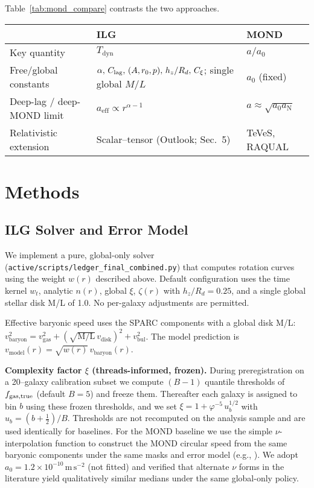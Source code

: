 \documentclass[usenatbib]{mnras}
\begin{document}
Table~\ref{tab:mond_compare} contrasts the two approaches.

\begin{table*}
\centering
\small
\setlength{\tabcolsep}{8pt}
\caption{Comparison of ILG and MOND Scaling Relations}
\label{tab:mond_compare}
\begin{tabularx}{0.97\textwidth}{l >{\raggedright\arraybackslash}X >{\raggedright\arraybackslash}X}
\toprule
 & ILG & MOND \\
\midrule
Key quantity & $T_\mathrm{dyn}$ & $a/a_0$ \\
Free/global constants & $\alpha,\,C_{\rm lag},\,(A,r_0,p),\,h_z/R_d,\,C_\xi$; single global $M/L$ & $a_0$ (fixed) \\
Deep-lag / deep-MOND limit & $a_\mathrm{eff} \propto r^{\alpha-1}$ & $a \approx \sqrt{a_0 a_\mathrm{N}}$ \\
Relativistic extension & Scalar–tensor (Outlook; Sec.~5) & TeVeS, RAQUAL \\
\bottomrule
\end{tabularx}
\end{table*}

\section{Methods}

\subsection{ILG Solver and Error Model}

We implement a pure, global-only solver (\texttt{active/scripts/ledger\_final\_combined.py}) that computes rotation curves using the weight $w(r)$ described above. Default configuration uses the time kernel $w_t$, analytic $n(r)$, global $\xi$, $\zeta(r)$ with $h_z/R_d=0.25$, and a single global stellar disk M/L of 1.0. No per-galaxy adjustments are permitted.

Effective baryonic speed uses the SPARC components with a global disk M/L: $v_\mathrm{baryon}^2 = v_\mathrm{gas}^2 + (\sqrt{\mathrm{M/L}}\,v_\mathrm{disk})^2 + v_\mathrm{bul}^2$. The model prediction is $v_\mathrm{model}(r) = \sqrt{w(r)}\, v_\mathrm{baryon}(r)$.

\noindent\textbf{Complexity factor $\xi$ (threads-informed, frozen).}
During preregistration on a 20–galaxy calibration subset we compute $(B{-}1)$ quantile thresholds of $f_{\rm gas,true}$ (default $B{=}5$) and freeze them. Thereafter each galaxy is assigned to bin $b$ using these frozen thresholds, and we set $\xi=1+\varphi^{-5}\,u_b^{1/2}$ with $u_b=(b+\tfrac{1}{2})/B$. Thresholds are not recomputed on the analysis sample and are used identically for baselines.
For the MOND baseline we use the simple $\nu$-interpolation function to construct the MOND circular speed from the same baryonic components under the same masks and error model (e.g., \citealp{famaey2012}). We adopt $a_0 = 1.2\times 10^{-10}\,\mathrm{m\,s^{-2}}$ (not fitted) and verified that alternate $\nu$ forms in the literature yield qualitatively similar medians under the same global-only policy.
\end{document}

